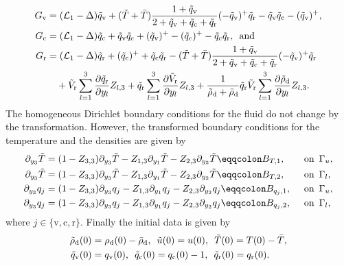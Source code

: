 \documentclass[10pt]{amsart}
\theoremstyle{plain}
\theoremstyle{definition}
\theoremstyle{thm}
\numberwithin{equation}{section}
\newcommand{\cL}{\mathcal{L}}
\newcommand{\del}{\partial}
\newcommand{\Gal}{\Gamma_l}
\newcommand{\Gau}{\Gamma_u}
\newcommand{\tand}{\enspace \text{and} \enspace}
\newcommand{\ton}{\enspace \text{on} \enspace}
\newcommand{\rd}{\mathrm{d}}
\newcommand{\rr}{\mathrm{r}}
\newcommand{\rv}{\mathrm{v}}
\newcommand{\rc}{\mathrm{c}}
\newcommand{\trho}{\Tilde{\rho}}
\newcommand{\tu}{\Tilde{u}}
\newcommand{\tT}{\Tilde{T}}
\newcommand{\tq}{\Tilde{q}}
\newcommand{\tV}{\Tilde{V}}
\begin{document}
\begin{equation*}
    \begin{aligned}
        G_\rv
        &= (\cL_1 - \Delta) \tq_\rv +(\tT +\bar{T}) \frac{1+\tq_\rv}{2 + \tq_\rv + \tq_\rc + \tq_\rr} ( -\tq_\rv)^+ \tq_\rr-\tq_\rv \tq_\rc-(\tq_\rv)^{+},\\
        G_\rc
        &= (\cL_1 - \Delta) \tq_\rc+\tq_\rv\tq_\rc +(\tq_\rv)^{+}-(\tq_\rc)^{+}-\tq_\rc\tq_\rr, \tand\\
        G_\rr
        &= (\cL_1 - \Delta) \tq_\rr +(\tq_\rc)^{+}+\tq_\rc\tq_\rr- (\tT +\bar{T}) \frac{1+\tq_\rv}{2 + \tq_\rv + \tq_\rc + \tq_\rr} ( -\tq_\rv)^+ \tq_\rr\\
        &\quad +\tV_\rr\sum_{l=1}^3 \frac{\del \tq_\rr}{\del y_{l}}Z_{l,3}
        +\tq_\rr\sum_{l=1}^3 \frac{\del \tV_\rr}{\del y_{l}} Z_{l,3}
        +\frac{1}{\trho_\rd + \bar{\rho}_\rd}\tq_\rr \tV_\rr\sum_{l=1}^3 \frac{\del \trho_\rd }{\del y_{l}} Z_{l,3}.
    \end{aligned}
\end{equation*}
The homogeneous Dirichlet boundary conditions for the fluid do not change by the transformation. 
However, the transformed boundary conditions for the temperature and the densities are given by
\begin{equation*}
    \begin{aligned}
        \del_{y_3} \tT
        &= (1-Z_{3,3}) \del_{y_3} \tT - Z_{1,3} \del_{y_1} \tT - Z_{2,3} \del_{y_2} \tT \eqqcolon B_{T,1}, &&\ton \Gau,\\
        \del_{y_3} \tT
        &= (1-Z_{3,3}) \del_{y_3} \tT - Z_{1,3} \del_{y_1} \tT - Z_{2,3} \del_{y_2} \tT \eqqcolon B_{T,2}, &&\ton \Gal,\\
        \del_{y_3} q_j
        &= (1-Z_{3,3}) \del_{y_3} q_j - Z_{1,3} \del_{y_1} q_j - Z_{2,3} \del_{y_2} q_j \eqqcolon B_{q_j ,1}, &&\ton \Gau,\\
        \del_{y_3} q_j
        &=  (1-Z_{3,3}) \del_{y_3} q_j - Z_{1,3} \del_{y_1} q_j - Z_{2,3} \del_{y_2} q_j \eqqcolon B_{q_j ,2}, &&\ton \Gal, 
    \end{aligned}
\end{equation*}
where $j \in \{\rv,\rc,\rr\}$. Finally the initial data is given by
\begin{equation}\label{eq: initial data global}
    \begin{aligned}
        \trho_\rd(0)&= \rho_\rd(0) -\bar{\rho}_\rd, \enspace \tu(0) = u(0), \enspace \tT(0) = T(0) -\bar{T}, \\ 
        \tq_\rv(0) &= q_\rv(0), \enspace \tq_\rc(0) = q_\rc(0)-1, \enspace \tq_\rr (0) = q_\rr(0).
    \end{aligned}
\end{equation}
\end{document}
